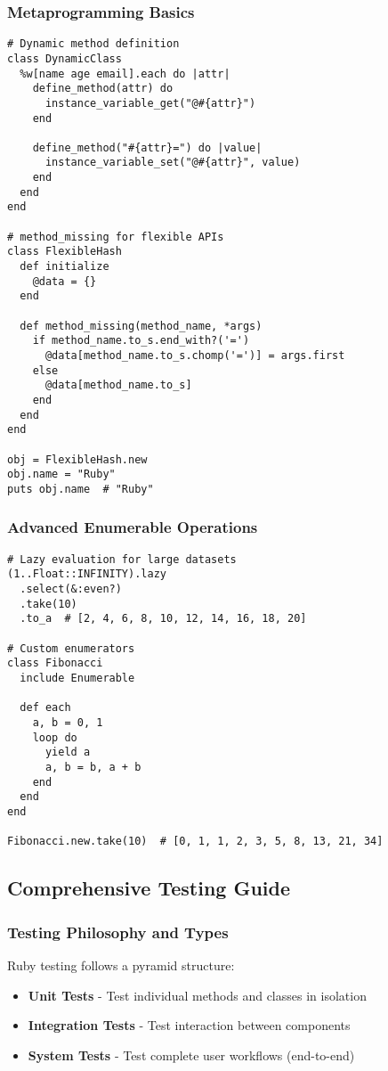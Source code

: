 \documentclass[12pt,a4paper]{article}
\begin{document}
\subsubsection{Metaprogramming Basics}

\begin{lstlisting}
# Dynamic method definition
class DynamicClass
  %w[name age email].each do |attr|
    define_method(attr) do
      instance_variable_get("@#{attr}")
    end
    
    define_method("#{attr}=") do |value|
      instance_variable_set("@#{attr}", value)
    end
  end
end

# method_missing for flexible APIs
class FlexibleHash
  def initialize
    @data = {}
  end
  
  def method_missing(method_name, *args)
    if method_name.to_s.end_with?('=')
      @data[method_name.to_s.chomp('=')] = args.first
    else
      @data[method_name.to_s]
    end
  end
end

obj = FlexibleHash.new
obj.name = "Ruby"
puts obj.name  # "Ruby"
\end{lstlisting}

\subsubsection{Advanced Enumerable Operations}

\begin{lstlisting}
# Lazy evaluation for large datasets
(1..Float::INFINITY).lazy
  .select(&:even?)
  .take(10)
  .to_a  # [2, 4, 6, 8, 10, 12, 14, 16, 18, 20]

# Custom enumerators
class Fibonacci
  include Enumerable
  
  def each
    a, b = 0, 1
    loop do
      yield a
      a, b = b, a + b
    end
  end
end

Fibonacci.new.take(10)  # [0, 1, 1, 2, 3, 5, 8, 13, 21, 34]
\end{lstlisting}

\subsection{Comprehensive Testing Guide}

\subsubsection{Testing Philosophy and Types}

Ruby testing follows a pyramid structure:
\begin{itemize}
    \item \textbf{Unit Tests} - Test individual methods and classes in isolation
    \item \textbf{Integration Tests} - Test interaction between components
    \item \textbf{System Tests} - Test complete user workflows (end-to-end)
\end{itemize}
\end{document}
